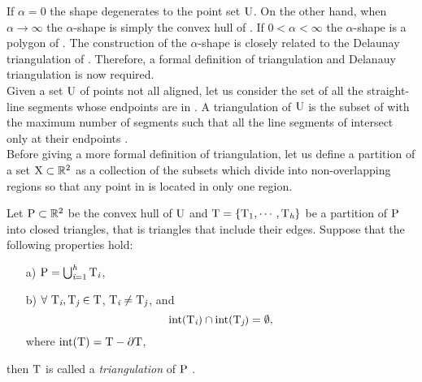 If $\alpha = 0$ the shape degenerates to the point set $\mbox{$\textup{U}$}$. On the other hand, when $\alpha\rightarrow\infty$ the $\alpha$-shape is simply the convex hull of . If $0<\alpha<\infty$ the $\alpha$-shape is a polygon of  \cite{edelsbrunner1994three}. The construction of the $\alpha$-shape is closely related to the Delaunay triangulation of  \cite{mucke1993shapes}. Therefore, a formal definition of triangulation and Delanauy triangulation is now required. \\ \indent
Given a set $\mbox{$\textup{U}$}$ of points not all aligned, let us consider the set  of all the straight-line segments whose endpoints are in . 
A triangulation  of $\mbox{$\textup{U}$}$ is the subset of  with the maximum number of segments such that all the line segments of  intersect only at their endpoints \cite{lloyd1977triangulations}. 
\\ \indent Before giving a more formal definition of triangulation, let us define a partition of a set $\mbox{$\textup{X}$}\subset \mathbb{R}^2$ as a collection of the subsets which divide  into non-overlapping regions so that any point in  is located in only one region. 
\begin{definition} \indent Let $\mbox{$\textup{P}$}\subset \mathbb{R}^2$ be the convex hull of $\mbox{$\textup{U}$}$ and $\mbox{$\textup{T}$} = \{\mbox{$\textup{T}$}_1, \cdots, \mbox{$\textup{T}$}_{\textit{h}}\}$ be a partition of $\mbox{$\textup{P}$}$ into closed triangles, that is triangles that include their edges. Suppose that the following properties hold:
\begin{itemize}
\item[a)] $\mbox{$\textup{P}$} = \bigcup_{\textit{i} = 1}^{\textit{h}}\mbox{$\textup{T}$}_{\textit{i}}$,
\item[b)] $\forall \mbox{ $\textup{T}$}_{\textit{i}}, \mbox{$\textup{T}$}_{\textit{j}} \in \mbox{$\textup{T}$}$, $\mbox{$\textup{T}$}_{\textit{i}} \neq \mbox{$\textup{T}$}_{\textit{j}}$, and 
\begin{equation*}
\textrm{int}(\mbox{$\textup{T}$}_{\textit{i}})\cap \textrm{int}(\mbox{$\textup{T}$}_{\textit{j}}) = \emptyset,
\end{equation*}
where $\textrm{int}(\mbox{$\textup{T}$}) = \mbox{$\textup{T}$}-\partial \mbox{$\textup{T}$}$,
\end{itemize}
then $\mbox{$\textup{T}$}$ is called a \textit{triangulation} of $\mbox{$\textup{P}$}$ \cite{Numericalmethods}.
\end{definition}
